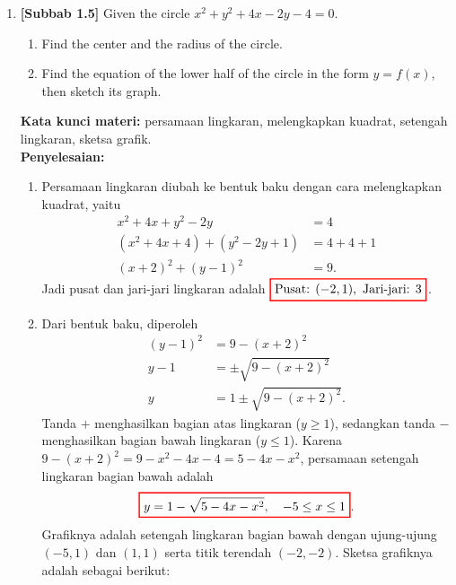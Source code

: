 \documentclass[10pt,openany,a4paper]{article}
\theoremstyle{definition}
\theoremstyle{definition}
\theoremstyle{plain}
\newenvironment{jawab}[2][tes]{%
\par\noindent\textbf{Kata kunci materi:} #1.\\
\textbf{Penyelesaian:} #2%
}{}
\begin{document}
\begin{enumerate}
    \item \textbf{[Subbab 1.5]} Given the circle $x^2+y^2+4x-2y-4=0$.
    \begin{enumerate}
        \item Find the center and the radius of the circle.
        \item Find the equation of the lower half of the circle in the form $y=f(x)$, then sketch its graph.
    \end{enumerate}
    \begin{jawab}[persamaan lingkaran, melengkapkan kuadrat, setengah lingkaran, sketsa grafik]{
        \begin{enumerate}
            \item Persamaan lingkaran diubah ke bentuk baku dengan cara melengkapkan kuadrat, yaitu
            \begin{align*}
                x^2+4x+y^2-2y &= 4\\
                (x^2+4x+4)+(y^2-2y+1) &= 4+4+1\\
                (x+2)^2+(y-1)^2 &= 9.
            \end{align*}
            Jadi pusat dan jari-jari lingkaran adalah $\colorlet{oldcolor}{.}
        \color{red}
        \setlength{\fboxrule}{1pt} \boxed{\color{oldcolor}\text{Pusat: }(-2,1),~\text{Jari-jari: }3}\color{oldcolor}$.
            \item Dari bentuk baku, diperoleh
            \begin{align*}
                (y-1)^2 &= 9-(x+2)^2\\
                y-1 &= \pm\sqrt{9-(x+2)^2}\\
                y &= 1\pm\sqrt{9-(x+2)^2}.
            \end{align*}
            Tanda $+$ menghasilkan bagian atas lingkaran ($y\geq 1$), sedangkan tanda $-$ menghasilkan bagian bawah lingkaran ($y\leq 1$). Karena $9-(x+2)^2=9-x^2-4x-4=5-4x-x^2$, persamaan setengah lingkaran bagian bawah adalah
            \begin{align*}
                \colorlet{oldcolor}{.}
        \color{red}
        \setlength{\fboxrule}{1pt} \boxed{\color{oldcolor}y=1-\sqrt{5-4x-x^2},\quad -5\leq x\leq 1}\color{oldcolor}.
            \end{align*}
            Grafiknya adalah setengah lingkaran bagian bawah dengan ujung-ujung $(-5,1)$ dan $(1,1)$ serta titik terendah $(-2,-2)$. Sketsa grafiknya adalah sebagai berikut:
            \begin{center}
                \begin{tikzpicture}

\end{tikzpicture}
\end{center}
\end{enumerate}}
\end{jawab}
\end{enumerate}
\end{document}
